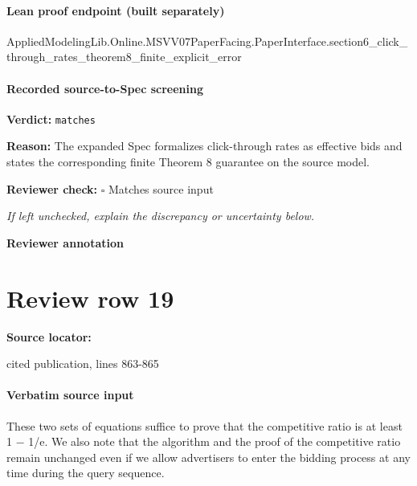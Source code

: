 \documentclass[10pt]{article}
\newcommand{\reviewerbox}{%
  \par\noindent\fbox{\parbox{0.96\linewidth}{\rule{0pt}{0.38in}}}\par
}
\newcommand{\reviewmatch}[1]{%
  \par\noindent\textbf{Reviewer check:} $\square$\; #1\par
  \noindent\emph{If left unchecked, explain the discrepancy or uncertainty below.}\par
}
\begin{document}
\paragraph{Lean proof endpoint (built separately)}\begin{ReviewVerbatim}
AppliedModelingLib.Online.MSVV07PaperFacing.PaperInterface.section6_click_through_rates_theorem8_finite_explicit_error
\end{ReviewVerbatim}

\paragraph{Recorded source-to-Spec screening}
\textbf{Verdict:} \texttt{matches}
\\
{\raggedright
\textbf{Reason:} The expanded Spec formalizes click-\allowbreak{}through rates as effective bids and states the corresponding finite Theorem 8 guarantee on the source model.\allowbreak{}
\par}
\reviewmatch{Matches source input}
\noindent\textbf{Reviewer annotation}\par
\reviewerbox
\clearpage
\hypertarget{source-claim-5601b1ced9bdcb1e}{}
\section*{Review row 19}
\textbf{Source locator:} {\footnotesize\raggedright cited publication, lines 863-\allowbreak{}865\par}
\paragraph{Verbatim source input}
\begin{ReviewVerbatim}
These two sets of equations suffice to prove that the competitive ratio is at least 1 − 1/e. We
also note that the algorithm and the proof of the competitive ratio remain unchanged even if
we allow advertisers to enter the bidding process at any time during the query sequence.
\end{ReviewVerbatim}
\end{document}
